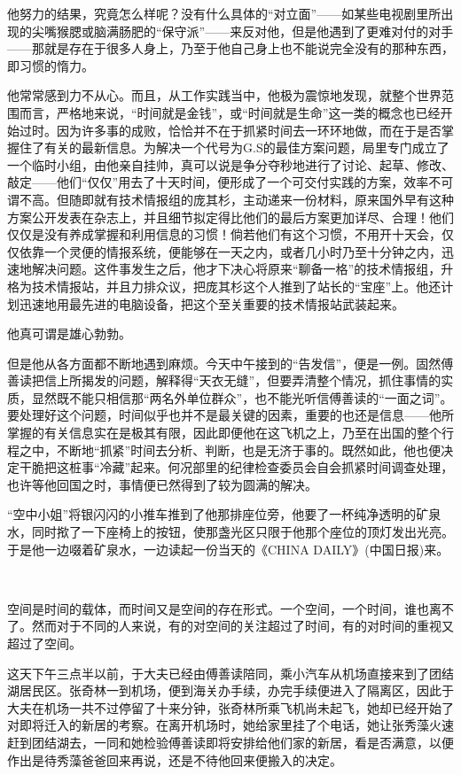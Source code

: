 \par 他努力的结果，究竟怎么样呢？没有什么具体的“对立面”——如某些电视剧里所出现的尖嘴猴腮或脑满肠肥的“保守派”——来反对他，但是他遇到了更难对付的对手——那就是存在于很多人身上，乃至于他自己身上也不能说完全没有的那种东西，即习惯的惰力。
\par 他常常感到力不从心。而且，从工作实践当中，他极为震惊地发现，就整个世界范围而言，严格地来说，“时间就是金钱”，或“时间就是生命”这一类的概念也已经开始过时。因为许多事的成败，恰恰并不在于抓紧时间去一环环地做，而在于是否掌握住了有关的最新信息。为解决一个代号为G.S的最佳方案问题，局里专门成立了一个临时小组，由他亲自挂帅，真可以说是争分夺秒地进行了讨论、起草、修改、敲定——他们“仅仅”用去了十天时间，便形成了一个可交付实践的方案，效率不可谓不高。但随即就有技术情报组的庞其杉，主动递来一份材料，原来国外早有这种方案公开发表在杂志上，并且细节拟定得比他们的最后方案更加详尽、合理！他们仅仅是没有养成掌握和利用信息的习惯！倘若他们有这个习惯，不用开十天会，仅仅依靠一个灵便的情报系统，便能够在一天之内，或者几小时乃至十分钟之内，迅速地解决问题。这件事发生之后，他才下决心将原来“聊备一格”的技术情报组，升格为技术情报站，并且力排众议，把庞其杉这个人推到了站长的“宝座”上。他还计划迅速地用最先进的电脑设备，把这个至关重要的技术情报站武装起来。
\par 他真可谓是雄心勃勃。
\par 但是他从各方面都不断地遇到麻烦。今天中午接到的“告发信”，便是一例。固然傅善读把信上所揭发的问题，解释得“天衣无缝”，但要弄清整个情况，抓住事情的实质，显然既不能只相信那“两名外单位群众”，也不能光听信傅善读的“一面之词”。要处理好这个问题，时间似乎也并不是最关键的因素，重要的也还是信息——他所掌握的有关信息实在是极其有限，因此即便他在这飞机之上，乃至在出国的整个行程之中，不断地“抓紧”时间去分析、判断，也是无济于事的。既然如此，他也便决定干脆把这桩事“冷藏”起来。何况部里的纪律检查委员会自会抓紧时间调查处理，也许等他回国之时，事情便已然得到了较为圆满的解决。
\par “空中小姐”将银闪闪的小推车推到了他那排座位旁，他要了一杯纯净透明的矿泉水，同时揿了一下座椅上的按钮，使那盏光区只限于他那个座位的顶灯发出光亮。于是他一边啜着矿泉水，一边读起一份当天的《CHINA DAILY》(中国日报)来。
\par  
\par 空间是时间的载体，而时间又是空间的存在形式。一个空间，一个时间，谁也离不了。然而对于不同的人来说，有的对空间的关注超过了时间，有的对时间的重视又超过了空间。
\par 这天下午三点半以前，于大夫已经由傅善读陪同，乘小汽车从机场直接来到了团结湖居民区。张奇林一到机场，便到海关办手续，办完手续便进入了隔离区，因此于大夫在机场一共不过停留了十来分钟，张奇林所乘飞机尚未起飞，她却已经开始了对即将迁入的新居的考察。在离开机场时，她给家里挂了个电话，她让张秀藻火速赶到团结湖去，一同和她检验傅善读即将安排给他们家的新居，看是否满意，以便作出是待秀藻爸爸回来再说，还是不待他回来便搬入的决定。
